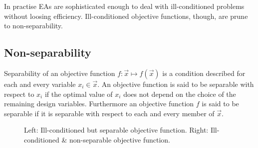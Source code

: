In practise EAs are sophisticated enough to deal with ill-conditioned problems without loosing efficiency. Ill-conditioned objective functions, though, are prune to non-separability.         


\subsection{Non-separability}     
Separability of an objective function $f:\vec{x}\mapsto f(\vec{x})$ is a condition described for each and every variable $x_i \in \vec{x}$. An objective function is said to be separable with respect to $x_i$ if the optimal value of $x_i$ does not depend on the choice of the remaining design variables. Furthermore an objective function $f$ is said to be separable if it is separable with respect to each and every member of $\vec{x}$.


\begin{figure}[h!]
\begin{minipage}[b]{0.5\linewidth}
 \centering
\end{minipage}
\begin{minipage}[b]{0.5\linewidth}
 \centering
\end{minipage}
\caption{Left: Ill-conditioned but separable objective function. Right: Ill-conditioned \& non-separable objective function.} 
\label{nonsep}
\end{figure}

